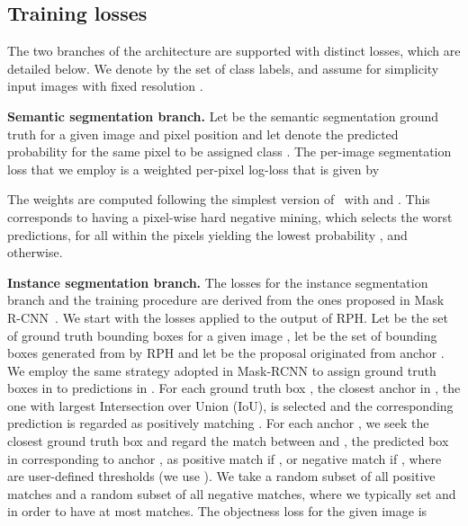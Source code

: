 \documentclass[10pt,twocolumn,letterpaper]{article}
\renewcommand{\paragraph}[1]{
        \vspace{3pt}
	\noindent\textbf{#1}}
\begin{document}
\subsection{Training losses}\label{ss:losses}

The two branches of the architecture are supported with distinct losses, which are detailed below.
We denote by  the set of class labels, and assume for simplicity input images with fixed resolution .

\paragraph{Semantic segmentation branch.}
Let  be the semantic segmentation ground truth for a given image and pixel position  and let  denote the 
predicted probability for the same pixel to be assigned class .
The per-image segmentation loss that we employ is a weighted per-pixel log-loss that is given by

The weights are computed following the simplest version of~\cite{RotNeuKon17cvpr} with  and . This corresponds to having a pixel-wise hard negative mining, which selects the  worst predictions, \ie  for all  within the  pixels yielding the lowest probability , and  otherwise.


\paragraph{Instance segmentation branch.}
The losses for the instance segmentation branch and the training procedure are derived from the ones proposed in Mask R-CNN~\cite{He2017}. 
We start with the losses applied to the output of RPH. Let  be the set of ground truth bounding boxes for a given image , let  be the set of bounding boxes generated from  by RPH and let
 be the proposal originated from anchor .
We employ the same strategy adopted in Mask-RCNN to assign ground truth boxes in  to predictions in .
For each ground truth box , the closest anchor in , \ie the one with largest Intersection over Union (IoU), is selected and the corresponding prediction  is regarded as positively matching . For each anchor , we seek the closest ground truth box  and regard the match between  and , \ie the predicted box in  corresponding to anchor , as positive match if , or negative match if , where  are user-defined thresholds (we use ). We take a random subset  of all positive matches and a random subset  of all negative matches, where we typically set  and  in order to have at most  matches. 
The objectness loss for the given image is
\end{document}
